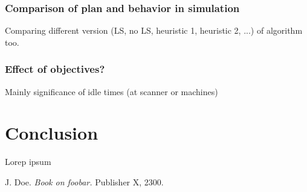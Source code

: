 \documentclass{ctuthesis}
\begin{document}
\subsection{Comparison of plan and behavior in simulation}
Comparing different version (LS, no LS, heuristic 1, heuristic 2, ...) of algorithm too.
\subsection{Effect of objectives?}
Mainly significance of idle times (at scanner or machines)
\chapter{Conclusion}

Lorep ipsum \cite{doe}

\begin{thebibliography}{1}

 J. Doe. \emph{Book on foobar.} Publisher X,
 2300.

\end{thebibliography}
\end{document}
